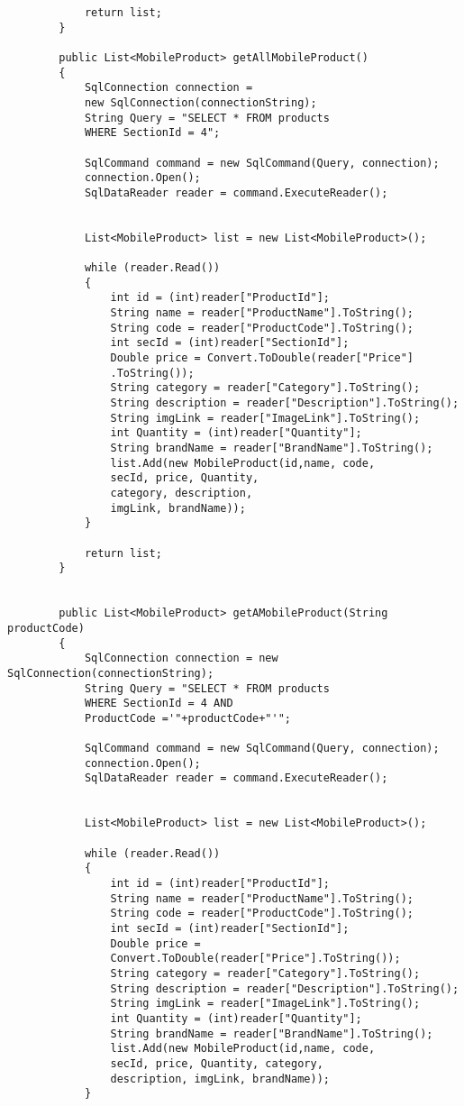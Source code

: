 \begin{lstlisting}
            return list;
        }

        public List<MobileProduct> getAllMobileProduct()
        {
            SqlConnection connection = 
            new SqlConnection(connectionString);
            String Query = "SELECT * FROM products 
            WHERE SectionId = 4";

            SqlCommand command = new SqlCommand(Query, connection);
            connection.Open();
            SqlDataReader reader = command.ExecuteReader();


            List<MobileProduct> list = new List<MobileProduct>();

            while (reader.Read())
            {
                int id = (int)reader["ProductId"];
                String name = reader["ProductName"].ToString();
                String code = reader["ProductCode"].ToString();
                int secId = (int)reader["SectionId"];
                Double price = Convert.ToDouble(reader["Price"]
                .ToString());
                String category = reader["Category"].ToString();
                String description = reader["Description"].ToString();
                String imgLink = reader["ImageLink"].ToString();
                int Quantity = (int)reader["Quantity"];
                String brandName = reader["BrandName"].ToString();
                list.Add(new MobileProduct(id,name, code, 
                secId, price, Quantity, 
                category, description, 
                imgLink, brandName));
            }

            return list;
        }


        public List<MobileProduct> getAMobileProduct(String productCode)
        {
            SqlConnection connection = new SqlConnection(connectionString);
            String Query = "SELECT * FROM products 
            WHERE SectionId = 4 AND 
            ProductCode ='"+productCode+"'";

            SqlCommand command = new SqlCommand(Query, connection);
            connection.Open();
            SqlDataReader reader = command.ExecuteReader();


            List<MobileProduct> list = new List<MobileProduct>();

            while (reader.Read())
            {
                int id = (int)reader["ProductId"];
                String name = reader["ProductName"].ToString();
                String code = reader["ProductCode"].ToString();
                int secId = (int)reader["SectionId"];
                Double price = 
                Convert.ToDouble(reader["Price"].ToString());
                String category = reader["Category"].ToString();
                String description = reader["Description"].ToString();
                String imgLink = reader["ImageLink"].ToString();
                int Quantity = (int)reader["Quantity"];
                String brandName = reader["BrandName"].ToString();
                list.Add(new MobileProduct(id,name, code,
                secId, price, Quantity, category, 
                description, imgLink, brandName));
            }


\end{lstlisting}
